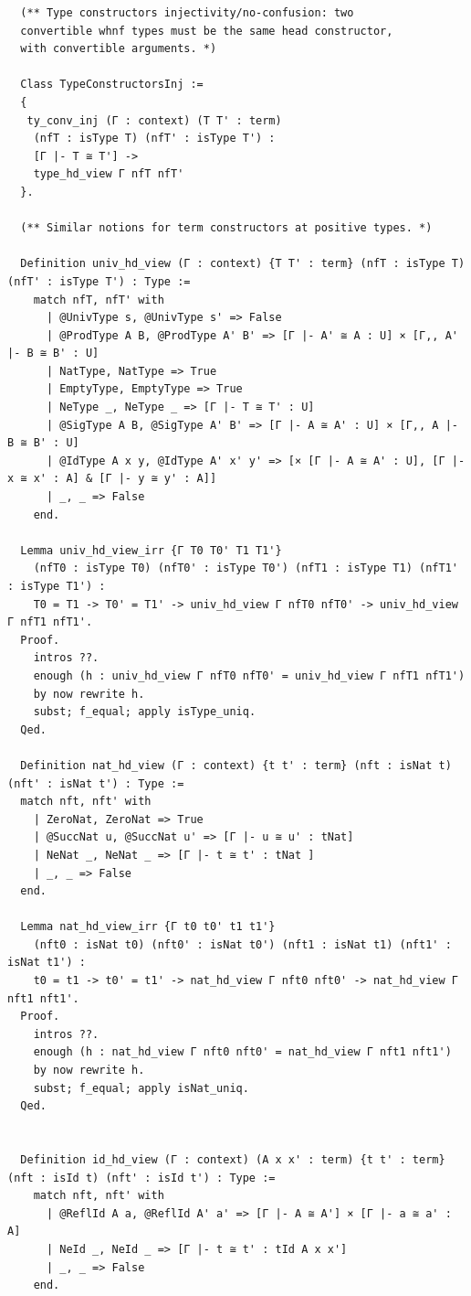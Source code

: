 \begin{lstlisting}
  (** Type constructors injectivity/no-confusion: two
  convertible whnf types must be the same head constructor,
  with convertible arguments. *)

  Class TypeConstructorsInj :=
  {
   ty_conv_inj (Γ : context) (T T' : term)
    (nfT : isType T) (nfT' : isType T') :
    [Γ |- T ≅ T'] ->
    type_hd_view Γ nfT nfT'
  }.

  (** Similar notions for term constructors at positive types. *)

  Definition univ_hd_view (Γ : context) {T T' : term} (nfT : isType T) (nfT' : isType T') : Type :=
    match nfT, nfT' with
      | @UnivType s, @UnivType s' => False
      | @ProdType A B, @ProdType A' B' => [Γ |- A' ≅ A : U] × [Γ,, A' |- B ≅ B' : U]
      | NatType, NatType => True
      | EmptyType, EmptyType => True
      | NeType _, NeType _ => [Γ |- T ≅ T' : U]
      | @SigType A B, @SigType A' B' => [Γ |- A ≅ A' : U] × [Γ,, A |- B ≅ B' : U]
      | @IdType A x y, @IdType A' x' y' => [× [Γ |- A ≅ A' : U], [Γ |- x ≅ x' : A] & [Γ |- y ≅ y' : A]]
      | _, _ => False
    end.

  Lemma univ_hd_view_irr {Γ T0 T0' T1 T1'}
    (nfT0 : isType T0) (nfT0' : isType T0') (nfT1 : isType T1) (nfT1' : isType T1') :
    T0 = T1 -> T0' = T1' -> univ_hd_view Γ nfT0 nfT0' -> univ_hd_view Γ nfT1 nfT1'.
  Proof.
    intros ??.
    enough (h : univ_hd_view Γ nfT0 nfT0' = univ_hd_view Γ nfT1 nfT1')
    by now rewrite h.
    subst; f_equal; apply isType_uniq.
  Qed.

  Definition nat_hd_view (Γ : context) {t t' : term} (nft : isNat t) (nft' : isNat t') : Type :=
  match nft, nft' with
    | ZeroNat, ZeroNat => True
    | @SuccNat u, @SuccNat u' => [Γ |- u ≅ u' : tNat]
    | NeNat _, NeNat _ => [Γ |- t ≅ t' : tNat ]
    | _, _ => False
  end.

  Lemma nat_hd_view_irr {Γ t0 t0' t1 t1'}
    (nft0 : isNat t0) (nft0' : isNat t0') (nft1 : isNat t1) (nft1' : isNat t1') :
    t0 = t1 -> t0' = t1' -> nat_hd_view Γ nft0 nft0' -> nat_hd_view Γ nft1 nft1'.
  Proof.
    intros ??.
    enough (h : nat_hd_view Γ nft0 nft0' = nat_hd_view Γ nft1 nft1')
    by now rewrite h.
    subst; f_equal; apply isNat_uniq.
  Qed.


  Definition id_hd_view (Γ : context) (A x x' : term) {t t' : term} (nft : isId t) (nft' : isId t') : Type :=
    match nft, nft' with
      | @ReflId A a, @ReflId A' a' => [Γ |- A ≅ A'] × [Γ |- a ≅ a' : A]
      | NeId _, NeId _ => [Γ |- t ≅ t' : tId A x x']
      | _, _ => False
    end.


\end{lstlisting}
